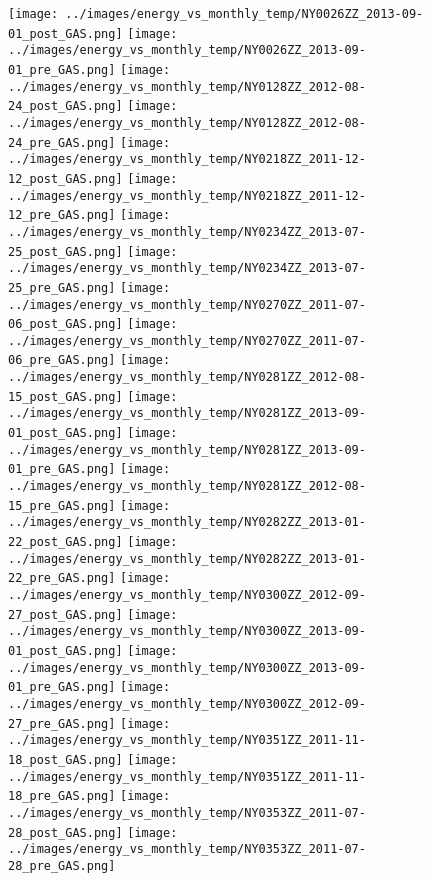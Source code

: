 \clearpage
\begin{figure}
\centering
\texttt{[image: ../images/energy\_vs\_monthly\_temp/NY0026ZZ\_2013-09-01\_post\_GAS.png]}
\texttt{[image: ../images/energy\_vs\_monthly\_temp/NY0026ZZ\_2013-09-01\_pre\_GAS.png]}
\texttt{[image: ../images/energy\_vs\_monthly\_temp/NY0128ZZ\_2012-08-24\_post\_GAS.png]}
\texttt{[image: ../images/energy\_vs\_monthly\_temp/NY0128ZZ\_2012-08-24\_pre\_GAS.png]}
\texttt{[image: ../images/energy\_vs\_monthly\_temp/NY0218ZZ\_2011-12-12\_post\_GAS.png]}
\texttt{[image: ../images/energy\_vs\_monthly\_temp/NY0218ZZ\_2011-12-12\_pre\_GAS.png]}
\texttt{[image: ../images/energy\_vs\_monthly\_temp/NY0234ZZ\_2013-07-25\_post\_GAS.png]}
\texttt{[image: ../images/energy\_vs\_monthly\_temp/NY0234ZZ\_2013-07-25\_pre\_GAS.png]}
\texttt{[image: ../images/energy\_vs\_monthly\_temp/NY0270ZZ\_2011-07-06\_post\_GAS.png]}
\texttt{[image: ../images/energy\_vs\_monthly\_temp/NY0270ZZ\_2011-07-06\_pre\_GAS.png]}
\texttt{[image: ../images/energy\_vs\_monthly\_temp/NY0281ZZ\_2012-08-15\_post\_GAS.png]}
\texttt{[image: ../images/energy\_vs\_monthly\_temp/NY0281ZZ\_2013-09-01\_post\_GAS.png]}
\texttt{[image: ../images/energy\_vs\_monthly\_temp/NY0281ZZ\_2013-09-01\_pre\_GAS.png]}
\texttt{[image: ../images/energy\_vs\_monthly\_temp/NY0281ZZ\_2012-08-15\_pre\_GAS.png]}
\texttt{[image: ../images/energy\_vs\_monthly\_temp/NY0282ZZ\_2013-01-22\_post\_GAS.png]}
\texttt{[image: ../images/energy\_vs\_monthly\_temp/NY0282ZZ\_2013-01-22\_pre\_GAS.png]}
\texttt{[image: ../images/energy\_vs\_monthly\_temp/NY0300ZZ\_2012-09-27\_post\_GAS.png]}
\texttt{[image: ../images/energy\_vs\_monthly\_temp/NY0300ZZ\_2013-09-01\_post\_GAS.png]}
\texttt{[image: ../images/energy\_vs\_monthly\_temp/NY0300ZZ\_2013-09-01\_pre\_GAS.png]}
\texttt{[image: ../images/energy\_vs\_monthly\_temp/NY0300ZZ\_2012-09-27\_pre\_GAS.png]}
\texttt{[image: ../images/energy\_vs\_monthly\_temp/NY0351ZZ\_2011-11-18\_post\_GAS.png]}
\texttt{[image: ../images/energy\_vs\_monthly\_temp/NY0351ZZ\_2011-11-18\_pre\_GAS.png]}
\texttt{[image: ../images/energy\_vs\_monthly\_temp/NY0353ZZ\_2011-07-28\_post\_GAS.png]}
\texttt{[image: ../images/energy\_vs\_monthly\_temp/NY0353ZZ\_2011-07-28\_pre\_GAS.png]}
\end{figure}
